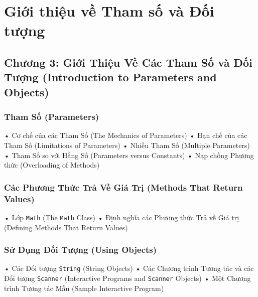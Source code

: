 
\providecommand{\pandocbounded}[1]{#1}
\makeatletter
\def\maxwidth{\ifdim\Gin@nat@width>\linewidth\linewidth\else\Gin@nat@width\fi}
\def\maxheight{\ifdim\Gin@nat@height>\textheight\textheight\else\Gin@nat@height\fi}
\makeatother
\providecommand{\tightlist}{\setlength{\itemsep}{0pt}\setlength{\parskip}{0pt}}
\chapter{Giới thiệu về Tham số và Đối tượng}
\section{Chương 3: Giới Thiệu Về Các Tham Số và Đối Tượng (Introduction
to Parameters and
Objects)}\label{chux1b0ux1a1ng-3-giux1edbi-thiux1ec7u-vux1ec1-cuxe1c-tham-sux1ed1-vuxe0-ux111ux1ed1i-tux1b0ux1ee3ng-introduction-to-parameters-and-objects}

\subsection{Tham Số (Parameters)}\label{tham-sux1ed1-parameters}

• Cơ chế của các Tham Số (The Mechanics of Parameters) • Hạn chế của các
Tham Số (Limitations of Parameters) • Nhiều Tham Số (Multiple
Parameters) • Tham Số so với Hằng Số (Parameters versus Constants) • Nạp
chồng Phương thức (Overloading of Methods)

\subsection{Các Phương Thức Trả Về Giá Trị (Methods That Return
Values)}\label{cuxe1c-phux1b0ux1a1ng-thux1ee9c-trux1ea3-vux1ec1-giuxe1-trux1ecb-methods-that-return-values}

• Lớp \texttt{Math} (The \texttt{Math} Class) • Định nghĩa các Phương
thức Trả về Giá trị (Defining Methods That Return Values)

\subsection{Sử Dụng Đối Tượng (Using
Objects)}\label{sux1eed-dux1ee5ng-ux111ux1ed1i-tux1b0ux1ee3ng-using-objects}

• Các Đối tượng \texttt{String} (String Objects) • Các Chương trình
Tương tác và các Đối tượng \texttt{Scanner} (Interactive Programs and
\texttt{Scanner} Objects) • Một Chương trình Tương tác Mẫu (Sample
Interactive Program)

